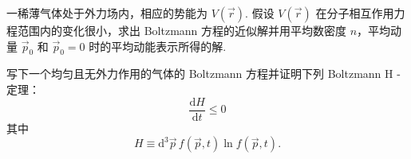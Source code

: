 \documentclass{assignment}
\begin{document}
\begin{prob}
    一稀薄气体处于外力场内，相应的势能为 $V(\vec{r})$. 假设 $V(\vec{r})$ 在分子相互作用力程范围内的变化很小，求出 Boltzmann 方程的近似解并用平均数密度 $n$，平均动量 $\vec{p}_0$ 和 $\vec{p}_0=0$ 时的平均动能表示所得的解.
\end{prob}
\begin{sol}
    
\end{sol}

\begin{prob}
    写下一个均匀且无外力作用的气体的 Boltzmann 方程并证明下列 Boltzmann H - 定理：
    \[
        \frac{\mathrm{d}H}{\mathrm{d}t}\leq 0
    \]
    其中
    \[
        H\equiv\mathrm{d}^3\vec{p}\,f(\vec{p},t)\ln f(\vec{p},t).
    \]
\end{prob}
\begin{pf}
    
\end{pf}
\end{document}
